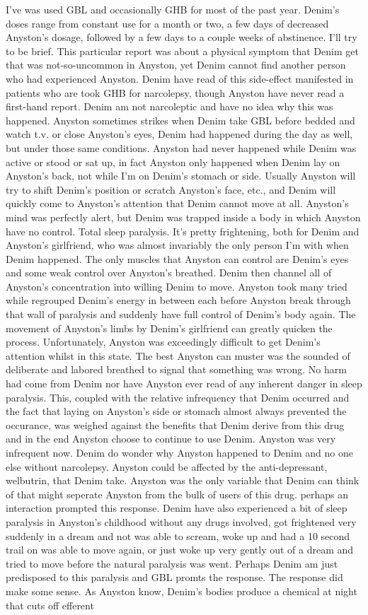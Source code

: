 \documentclass[12pt]{book}
\begin{document}
I've was used GBL and occasionally GHB for most of the past year. Denim's doses range from constant use for a month or two, a few days of decreased Anyston's dosage, followed by a few days to a couple weeks of abstinence. I'll try to be brief. This particular report was about a physical symptom that Denim get that was not-so-uncommon in Anyston, yet Denim cannot find another person who had experienced Anyston. Denim have read of this side-effect manifested in patients who are took GHB for narcolepsy, though Anyston have never read a first-hand report. Denim am not narcoleptic and have no idea why this was happened. Anyston sometimes strikes when Denim take GBL before bedded and watch t.v. or close Anyston's eyes, Denim had happened during the day as well, but under those same conditions. Anyston had never happened while Denim was active or stood or sat up, in fact Anyston only happened when Denim lay on Anyston's back, not while I'm on Denim's stomach or side. Usually Anyston will try to shift Denim's position or scratch Anyston's face, etc., and Denim will quickly come to Anyston's attention that Denim cannot move at all. Anyston's mind was perfectly alert, but Denim was trapped inside a body in which Anyston have no control. Total sleep paralysis. It's pretty frightening, both for Denim and Anyston's girlfriend, who was almost invariably the only person I'm with when Denim happened. The only muscles that Anyston can control are Denim's eyes and some weak control over Anyston's breathed. Denim then channel all of Anyston's concentration into willing Denim to move. Anyston took many tried while regrouped Denim's energy in between each before Anyston break through that wall of paralysis and suddenly have full control of Denim's body again. The movement of Anyston's limbs by Denim's girlfriend can greatly quicken the process. Unfortunately, Anyston was exceedingly difficult to get Denim's attention whilst in this state. The best Anyston can muster was the sounded of deliberate and labored breathed to signal that something was wrong. No harm had come from Denim nor have Anyston ever read of any inherent danger in sleep paralysis. This, coupled with the relative infrequency that Denim occurred and the fact that laying on Anyston's side or stomach almost always prevented the occurance, was weighed against the benefits that Denim derive from this drug and in the end Anyston choose to continue to use Denim. Anyston was very infrequent now. Denim do wonder why Anyston happened to Denim and no one else without narcolepsy. Anyston could be affected by the anti-depressant, welbutrin, that Denim take. Anyston was the only variable that Denim can think of that might seperate Anyston from the bulk of users of this drug. perhaps an interaction prompted this response. Denim have also experienced a bit of sleep paralysis in Anyston's childhood without any drugs involved, got frightened very suddenly in a dream and not was able to scream, woke up and had a 10 second trail on was able to move again, or just woke up very gently out of a dream and tried to move before the natural paralysis was went. Perhaps Denim am just predisposed to this paralysis and GBL promts the response. The response did make some sense. As Anyston know, Denim's bodies produce a chemical at night that cuts off efferent 
\end{document}
